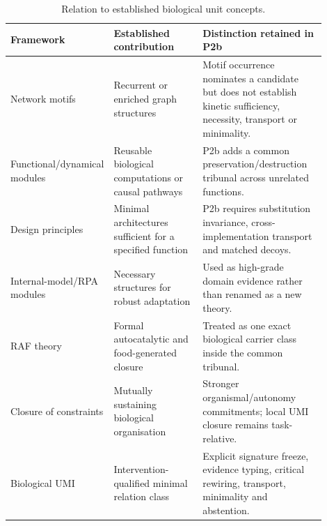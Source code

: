 \begin{table}[htbp]
\centering
\scriptsize
\caption{Relation to established biological unit concepts.}
\label{tab:bio-comparators}
\begin{tabular}{p{0.20\linewidth}p{0.30\linewidth}p{0.40\linewidth}}
\toprule
Framework & Established contribution & Distinction retained in P2b \\
\midrule
Network motifs & Recurrent or enriched graph structures & Motif occurrence nominates a candidate but does not establish kinetic sufficiency, necessity, transport or minimality. \\
Functional/dynamical modules & Reusable biological computations or causal pathways & P2b adds a common preservation/destruction tribunal across unrelated functions. \\
Design principles & Minimal architectures sufficient for a specified function & P2b requires substitution invariance, cross-implementation transport and matched decoys. \\
Internal-model/RPA modules & Necessary structures for robust adaptation & Used as high-grade domain evidence rather than renamed as a new theory. \\
RAF theory & Formal autocatalytic and food-generated closure & Treated as one exact biological carrier class inside the common tribunal. \\
Closure of constraints & Mutually sustaining biological organisation & Stronger organismal/autonomy commitments; local UMI closure remains task-relative. \\
Biological UMI & Intervention-qualified minimal relation class & Explicit signature freeze, evidence typing, critical rewiring, transport, minimality and abstention. \\
\bottomrule
\end{tabular}
\end{table}

